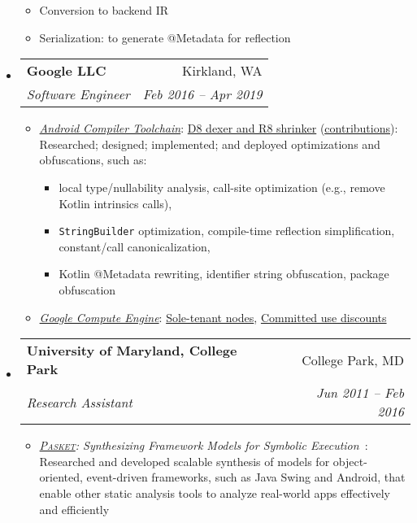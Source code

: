 \documentclass[letterpaper,11pt]{article}
\makeatletter
\newcommand{\ressubheading}[4]{
\begin{tabular*}{6.5in}{l@{\extracolsep{\fill}}r}
    \textbf{#1} & #2 \\
    \textit{#3} & \textit{#4} \\
\end{tabular*}\vspace{-6pt}}
\makeatother
\begin{document}
\begin{itemize}
{\begin{itemize}
\begin{itemize}
\item Conversion to backend IR
\item Serialization: to generate @Metadata for reflection
\end{itemize}
        \end{itemize}
        }
    \item
      \ressubheading{{Google LLC}}{Kirkland, WA}{Software Engineer}{Feb 2016 -- Apr 2019}
        {
\small
        \begin{itemize}
\item\emph{\href{https://developer.android.com/studio/preview/index.html}{Android Compiler Toolchain}}:
\href{https://r8.googlesource.com/r8}{D8 dexer and R8 shrinker} (\href{https://r8-review.googlesource.com/q/author:jsjeon+status:merged}{\underline{contributions}}):
Researched; designed; implemented; and deployed optimizations and obfuscations, such as:
\begin{itemize}
\item local type/nullability analysis, call-site optimization (e.g., remove Kotlin intrinsics calls),
\item \texttt{StringBuilder} optimization, compile-time reflection simplification, constant/call canonicalization,
\item Kotlin @Metadata rewriting, identifier string obfuscation, package obfuscation
\end{itemize}
\item\emph{\href{https://cloud.google.com/compute/}{Google Compute Engine}}:
\href{https://cloudplatform.googleblog.com/2018/06/Introducing-sole-tenant-nodes-for-Google-Compute-Engine.html}{Sole-tenant nodes},
\href{https://cloudplatform.googleblog.com/2017/09/committed-use-discounts-for-Google-Compute-Engine-now-generally-available.html}{Committed use discounts}
        \end{itemize}
        }
    \item
      \ressubheading{{University of Maryland, College Park}}{College Park, MD}{Research Assistant}{Jun 2011 -- Feb 2016}
        {
\small
        \begin{itemize}
\item\emph{\href{https://github.com/plum-umd/pasket}{\textsc{Pasket}}: Synthesizing Framework Models for Symbolic Execution}~\cite{FMSD17, icse16, fse15, cav15, popl14, jsk-tr}:
Researched and developed scalable synthesis of models for object-oriented,
event-driven frameworks, such as Java Swing and Android,
that enable other static analysis tools
to analyze real-world apps effectively and efficiently


\end{itemize}}
\end{itemize}
\end{document}
